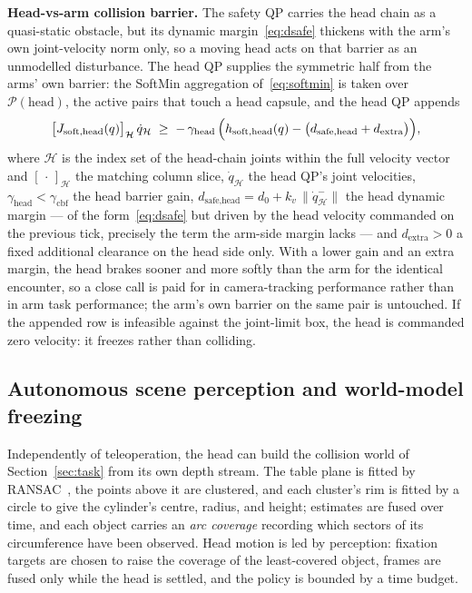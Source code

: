 \documentclass[12pt,a4paper,twoside,openright]{report}
\newcommand{\qdot}{\dot{q}}
\begin{document}
\textbf{Head-vs-arm collision barrier.} The safety QP carries the head chain as a quasi-static obstacle, but its dynamic margin~\eqref{eq:dsafe} thickens with the arm's own joint-velocity norm only, so a moving head acts on that barrier as an unmodelled disturbance. The head QP supplies the symmetric half from the arms' own barrier: the SoftMin aggregation of~\eqref{eq:softmin} is taken over $\mathcal{P}(\text{head})$, the active pairs that touch a head capsule, and the head QP appends
\begin{equation}
\bigl[J_{\text{soft},\text{head}}(q)\bigr]_{\mathcal{H}}\,\qdot_{\mathcal{H}}
\;\ge\;
-\,\gamma_{\text{head}}\,\Bigl(h_{\text{soft},\text{head}}(q) - \bigl(d_{\text{safe},\text{head}} + d_{\text{extra}}\bigr)\Bigr),
\label{eq:headcbf}
\end{equation}
where $\mathcal{H}$ is the index set of the head-chain joints within the full velocity vector and $[\,\cdot\,]_{\mathcal{H}}$ the matching column slice, $\qdot_{\mathcal{H}}$ the head QP's joint velocities, $\gamma_{\text{head}} < \gamma_{\text{cbf}}$ the head barrier gain, $d_{\text{safe},\text{head}} = d_0 + k_v\,\|\qdot_{\mathcal{H}}^{-}\|$ the head dynamic margin --- of the form~\eqref{eq:dsafe} but driven by the head velocity commanded on the previous tick, precisely the term the arm-side margin lacks --- and $d_{\text{extra}} > 0$ a fixed additional clearance on the head side only. With a lower gain and an extra margin, the head brakes sooner and more softly than the arm for the identical encounter, so a close call is paid for in camera-tracking performance rather than in arm task performance; the arm's own barrier on the same pair is untouched. If the appended row is infeasible against the joint-limit box, the head is commanded zero velocity: it freezes rather than colliding.

\subsection{Autonomous scene perception and world-model freezing}
\label{sec:convergence}

Independently of teleoperation, the head can build the collision world of Section~\ref{sec:task} from its own depth stream. The table plane is fitted by RANSAC~\cite{fischler1981ransac}, the points above it are clustered, and each cluster's rim is fitted by a circle to give the cylinder's centre, radius, and height; estimates are fused over time, and each object carries an \emph{arc coverage} recording which sectors of its circumference have been observed. Head motion is led by perception: fixation targets are chosen to raise the coverage of the least-covered object, frames are fused only while the head is settled, and the policy is bounded by a time budget.
\end{document}
